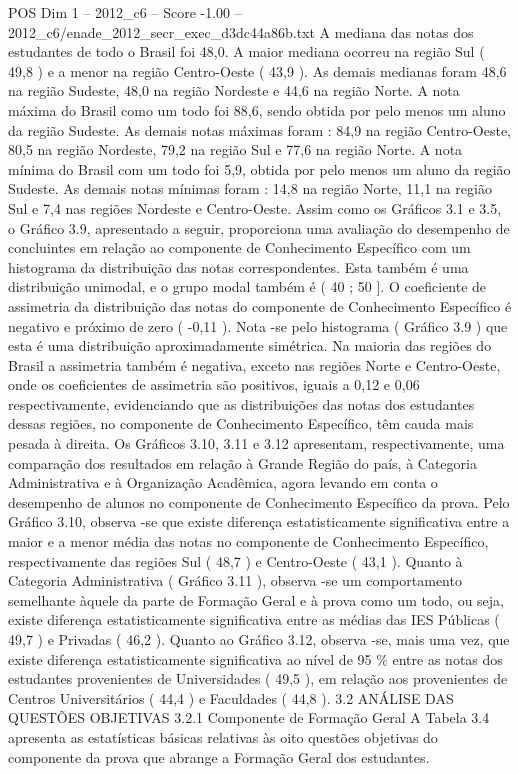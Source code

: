 \begin{textsample}{POS Dim 1 – 2012\_c6 – Score -1.00 – 2012\_c6/enade\_2012\_secr\_exec\_d3dc44a86b.txt}
A mediana das notas dos estudantes de todo o Brasil foi 48,0.
A maior mediana ocorreu na região Sul ( 49,8 ) e a menor na região Centro-Oeste ( 43,9 ).
As demais medianas foram 48,6 na região Sudeste, 48,0 na região Nordeste e 44,6 na região Norte.
A nota máxima do Brasil como um todo foi 88,6, sendo obtida por pelo menos um aluno da região Sudeste.
As demais notas máximas foram : 84,9 na região Centro-Oeste, 80,5 na região Nordeste, 79,2 na região Sul e 77,6 na região Norte.
A nota mínima do Brasil com um todo foi 5,9, obtida por pelo menos um aluno da região Sudeste.
As demais notas mínimas foram : 14,8 na região Norte, 11,1 na região Sul e 7,4 nas regiões Nordeste e Centro-Oeste.
Assim como os Gráficos 3.1 e 3.5, o Gráfico 3.9, apresentado a seguir, proporciona uma avaliação do desempenho de concluintes em relação ao componente de Conhecimento Específico com um histograma da distribuição das notas correspondentes.
Esta também é uma distribuição unimodal, e o grupo modal também é ( 40 ; 50 ].
O coeficiente de assimetria da distribuição das notas do componente de Conhecimento Específico é negativo e próximo de zero ( -0,11 ).
Nota -se pelo histograma ( Gráfico 3.9 ) que esta é uma distribuição aproximadamente simétrica.
Na maioria das regiões do Brasil a assimetria também é negativa, exceto nas regiões Norte e Centro-Oeste, onde os coeficientes de assimetria são positivos, iguais a 0,12 e 0,06 respectivamente, evidenciando que as distribuições das notas dos estudantes dessas regiões, no componente de Conhecimento Específico, têm cauda mais pesada à direita.
Os Gráficos 3.10, 3.11 e 3.12 apresentam, respectivamente, uma comparação dos resultados em relação à Grande Região do país, à Categoria Administrativa e à Organização Acadêmica, agora levando em conta o desempenho de alunos no componente de Conhecimento Específico da prova.
Pelo Gráfico 3.10, observa -se que existe diferença estatisticamente significativa entre a maior e a menor média das notas no componente de Conhecimento Específico, respectivamente das regiões Sul ( 48,7 ) e Centro-Oeste ( 43,1 ).
Quanto à Categoria Administrativa ( Gráfico 3.11 ), observa -se um comportamento semelhante àquele da parte de Formação Geral e à prova como um todo, ou seja, existe diferença estatisticamente significativa entre as médias das IES Públicas ( 49,7 ) e Privadas ( 46,2 ).
Quanto ao Gráfico 3.12, observa -se, mais uma vez, que existe diferença estatisticamente significativa ao nível de 95 \% entre as notas dos estudantes provenientes de Universidades ( 49,5 ), em relação aos provenientes de Centros Universitários ( 44,4 ) e Faculdades ( 44,8 ). 3.2 ANÁLISE DAS QUESTÕES OBJETIVAS 3.2.1 Componente de Formação Geral A Tabela 3.4 apresenta as estatísticas básicas relativas às oito questões objetivas do componente da prova que abrange a Formação Geral dos estudantes.

\end{textsample}
